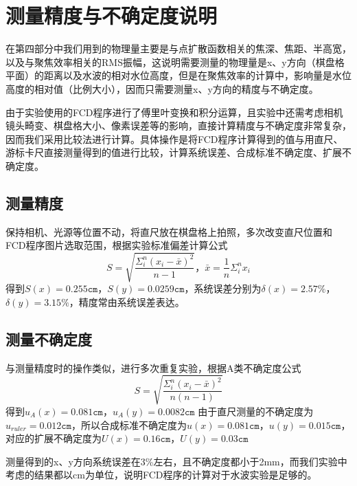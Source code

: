 \documentclass[11pt,a4paper]{ctexart}
\begin{document}
\section{测量精度与不确定度说明}

在第四部分中我们用到的物理量主要是与点扩散函数相关的焦深、焦距、半高宽，以及与聚焦效率相关的RMS振幅，这说明需要测量的物理量是x、y方向（棋盘格平面）的距离以及水波的相对水位高度，但是在聚焦效率的计算中，影响量是水位高度的相对值（比例大小），因而只需要测量x、y方向的精度与不确定度。

由于实验使用的FCD程序进行了傅里叶变换和积分运算，且实验中还需考虑相机镜头畸变、棋盘格大小、像素误差等的影响，直接计算精度与不确定度非常复杂，因而我们采用比较法进行计算。具体操作是将FCD程序计算得到的值与用直尺、游标卡尺直接测量得到的值进行比较，计算系统误差、合成标准不确定度、扩展不确定度\cite{JJF1001-2011}。

\subsection{测量精度}

保持相机、光源等位置不动，将直尺放在棋盘格上拍照，多次改变直尺位置和FCD程序图片选取范围，根据实验标准偏差计算公式\cite{JJF1001-2011}
\begin{equation}
S = \sqrt{\frac{\Sigma^{n}_{i} (x_i-\bar{x})^2}{n-1}}，\bar{x} = \frac{1}{n}\Sigma^{n}_{i} x_i
\end{equation}
得到$S(x) = 0.255\texttt{cm}$，$S(y) = 0.0259\texttt{cm}$，系统误差分别为$\delta(x)=2.57\%$，$\delta(y)=3.15\%$，精度常由系统误差表达。

\subsection{测量不确定度}

与测量精度时的操作类似，进行多次重复实验，根据A类不确定度公式
\begin{equation}
S = \sqrt{\frac{\Sigma^{n}_{i} (x_i-\bar{x})^2}{n(n-1)}}
\end{equation}
得到$u_A(x) = 0.081\texttt{cm}$，$u_A(y) = 0.0082\texttt{cm}$
由于直尺测量的不确定度为$u_{ruler} = 0.012\texttt{cm}$，所以合成标准不确定度为$u(x) = 0.081\texttt{cm}$，$u(y) = 0.015\texttt{cm}$，对应的扩展不确定度为$U(x) = 0.16\texttt{cm}$，$U(y) = 0.03\texttt{cm}$

测量得到的x、y方向系统误差在3\%左右，且不确定度都小于2mm，而我们实验中考虑的结果都以cm为单位，说明FCD程序的计算对于水波实验是足够的。
\end{document}
